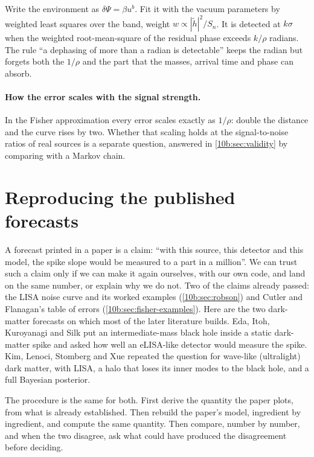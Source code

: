 \begin{keyidea}
Write the environment as $\delta\Psi=\beta u^b$. Fit it with the vacuum parameters by weighted least squares over the
band, weight $w\propto|\tilde h|^2/S_n$. It is detected at $k\sigma$ when the weighted root-mean-square of the residual
phase exceeds $k/\rho$ radians. The rule ``a dephasing of more than a radian is detectable'' \cite{Speeney2022} keeps the
radian but forgets both the $1/\rho$ and the part that the masses, arrival time and phase can absorb.
\end{keyidea}

\paragraph{How the error scales with the signal strength.} In the Fisher approximation every error scales exactly as
$1/\rho$: double the distance and the curve rises by two. Whether that scaling holds at the signal-to-noise ratios of
real sources is a separate question, answered in \cref{10b:sec:validity} by comparing with a Markov chain.
\section{Reproducing the published forecasts}
\label{10b:sec:reproduce}

A forecast printed in a paper is a claim: ``with this source, this detector and this model, the spike slope would be
measured to a part in a million''. We can trust such a claim only if we can make it again ourselves, with our own
code, and land on the same number, or explain why we do not. Two of the claims already passed: the LISA noise curve
and its worked examples (\cref{10b:sec:robson}) and Cutler and Flanagan's table of errors
(\cref{10b:sec:fisher-examples}). Here are the two dark-matter forecasts on which most of the later literature
builds. Eda, Itoh, Kuroyanagi and Silk \cite{Eda2015} put an intermediate-mass black hole inside a static
dark-matter spike and asked how well an eLISA-like detector would measure the spike. Kim, Lenoci, Stomberg and Xue
\cite{Kim2023} repeated the question for wave-like (ultralight) dark matter, with LISA, a halo that loses its inner
modes to the black hole, and a full Bayesian posterior.

The procedure is the same for both. First derive the quantity the paper plots, from what is already established.
Then rebuild the paper's model, ingredient by ingredient, and compute the same quantity. Then compare, number by
number, and when the two disagree, ask what could have produced the disagreement before deciding.

